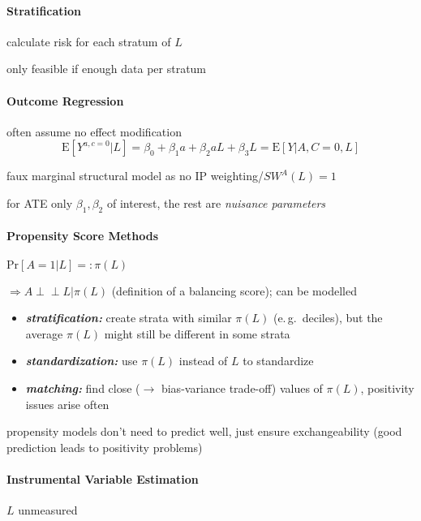 \documentclass[8pt,twoside]{extarticle}
\newcommand{\indep}{\perp \!\!\! \perp}
\begin{document}
\begin{multicols}{2}




\paragraph{Stratification}  calculate risk for each stratum of $L$

 only feasible if enough data per stratum


\paragraph{Outcome Regression} often assume no effect modification
$$\mathrm{E}\left[Y^{a,c=0}|L\right] = \beta_0 + \beta_1 a + \beta_2 aL +\beta_3 L = \mathrm{E}\left[Y|A, C=0, L\right]$$

 faux marginal structural model as no IP weighting/$SW^A(L)=1$

 for ATE only $\beta_1,\beta_2$ of interest, the rest are \textit{nuisance parameters}

\paragraph{Propensity Score Methods}
$\mathrm{Pr}\left[A=1|L\right] =: \pi(L)$ 
 
  $\Rightarrow A\indep L|\pi(L)$ (definition of a  balancing score); can be modelled  


\begin{itemize}[itemsep=0em, topsep=0pt, partopsep=0pt,parsep=0pt, leftmargin=1.5em]
\setlength{\itemsep}{0pt}%
\setlength{\parskip}{0pt}
\item \textit{\textbf{stratification:}} create strata with similar $\pi(L)$ (e.\,g.\ deciles), but the average $\pi(L)$ might still be different in some strata
\item \textit{\textbf{standardization:}} use $\pi(L)$ instead of $L$ to standardize
\item \textit{\textbf{matching:}} find close ($\rightarrow$ bias-variance trade-off) values of $\pi(L)$, positivity issues arise often
\end{itemize}

 propensity models don't need to predict well, just ensure exchangeability (good prediction leads to positivity problems)


\paragraph{Instrumental Variable Estimation} $L$ unmeasured


\end{multicols}
\end{document}
